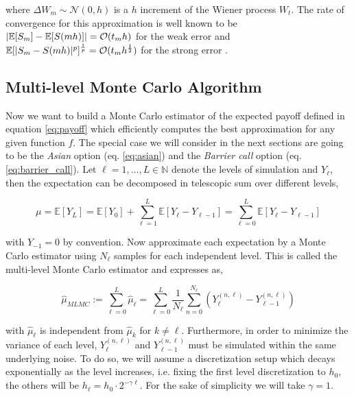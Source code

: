 where $\Delta W_m \sim \mathcal{N}(0,h)$ is a $h$ increment of the Wiener process $W_t$.
The rate of convergence for this approximation is well known to be $\lvert\mathbb{E}[S_m] - \mathbb{E}[S(mh)]\rvert = \mathcal{O}(t_m h)$ for the weak error and $\mathbb{E}[\lvert S_m - S(mh)\rvert^p]^{\frac{1}{p}} = \mathcal{O}(t_m h^{\frac{1}{2}})$ for the strong error \cite{em}.

\subsection{Multi-level Monte Carlo Algorithm}

Now we want to build a Monte Carlo estimator of the expected payoff defined in equation \ref{eq:payoff} which efficiently computes the best approximation for any given function $f$. The special case we will consider in the next sections are going to be the \textit{Asian} option (eq. \ref{eq:asian}) and the \textit{Barrier call} option (eq. \ref{eq:barrier_call}).    
Let $\ell = 1,\dots,L \in \mathbb{N}$ denote the levels of simulation and $Y_\ell$, then the expectation can be decomposed in telescopic sum over different levels,

\begin{equation}\label{eq:expectation}
\mu = \mathbb{E}[Y_L] = \mathbb{E}[Y_0] + \sum_{\ell=1}^L \mathbb{E}[Y_\ell - Y_{\ell-1}] = \sum_{\ell=0}^L \mathbb{E}[Y_\ell - Y_{\ell-1}] 
\end{equation}

with $Y_{-1} = 0$ by convention.
Now approximate each expectation by a Monte Carlo estimator using $N_\ell$ samples for each independent level. This is called the multi-level Monte Carlo estimator and expresses as,

\begin{equation}\label{eq:MLMC}
\hat{\mu}_{MLMC} := \sum_{\ell = 0}^L \hat{\mu}_\ell = \sum_{\ell = 0}^L \frac{1}{N_\ell}\sum_{n=0}^{N_\ell} (Y_\ell^{(n,\ell)} - Y_{\ell - 1}^{(n,\ell)})
\end{equation}

with $\hat{\mu}_\ell$ is independent from $\hat{\mu}_k$ for $k \neq \ell$.
Furthermore, in order to minimize the variance of each level, $Y_\ell^{(n,\ell)}$ and $Y_{\ell - 1}^{(n,\ell)}$ must be simulated within the same underlying noise.
To do so, we will assume a discretization setup which decays exponentially as the level increases, i.e. fixing the first level discretization to $h_0$, the others will be $h_\ell = h_0 \cdot 2^{-\gamma\ell}$. For the sake of simplicity we will take $\gamma = 1$.

